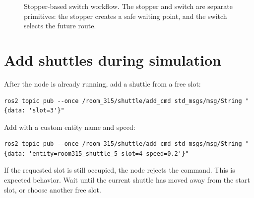 \documentclass[12pt,a4paper]{report}
\begin{document}
\begin{figure}[p]
\centering
{}
\caption{Stopper-based switch workflow. The stopper and switch are separate
primitives: the stopper creates a safe waiting point, and the switch selects the
future route.}
\label{fig:stop-switch-release-flow}
\end{figure}

\section{Add shuttles during simulation}

After the node is already running, add a shuttle from a free slot:

\begin{lstlisting}[style=terminalcode]
ros2 topic pub --once /room_315/shuttle/add_cmd std_msgs/msg/String "{data: 'slot=3'}"
\end{lstlisting}

Add with a custom entity name and speed:

\begin{lstlisting}[style=terminalcode]
ros2 topic pub --once /room_315/shuttle/add_cmd std_msgs/msg/String "{data: 'entity=room315_shuttle_5 slot=4 speed=0.2'}"
\end{lstlisting}

If the requested slot is still occupied, the node rejects the command. This is
expected behavior. Wait until the current shuttle has moved away from the start
slot, or choose another free slot.
\end{document}
